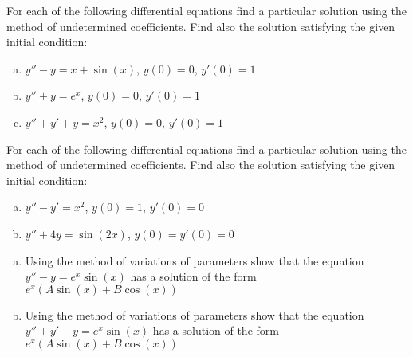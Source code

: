 \documentclass[12pt,letterpaper]{hmcpset}
\begin{document}

\begin{problem}[F1]
    For each of the following differential equations find a
    particular solution using the method of undetermined
    coefficients. Find also the solution satisfying the
    given initial condition:
    \begin{enumerate}[(a)]
        \item $y''-y=x+\sin(x)$, $y(0)=0$, $y'(0)=1$
        \item $y'' + y = e^x$, $y(0)=0$, $y'(0)=1$
        \item $y''+y'+y=x^2$, $y(0)=0$, $y'(0)=1$
    \end{enumerate}
\end{problem}

\begin{solution}
    \vfill
\end{solution}
\clearpage

\begin{problem}[F2]
    For each of the following differential equations find a
    particular solution using the method of undetermined
    coefficients. Find also the solution satisfying the
    given initial condition:
    \begin{enumerate}[(a)]
        \item $y''-y'=x^2$, $y(0)=1$, $y'(0)=0$
        \item $y''+4y=\sin(2x)$, $y(0)=y'(0)=0$
    \end{enumerate}
\end{problem}

\begin{solution}
    \vfill
\end{solution}
\clearpage

\begin{problem}[F3]
    \begin{enumerate}[(a)]
        \item Using the method of variations of parameters show 
            that the equation $y''-y=e^x\sin(x)$ has a solution 
            of the form $e^x(A\sin(x)+B\cos(x))$
        \item Using the method of variations of parameters show 
            that the equation $y''+y'-y=e^x\sin(x)$ has a solution 
            of the form $e^x(A\sin(x)+B\cos(x))$
    \end{enumerate}
\end{problem}
\end{document}
